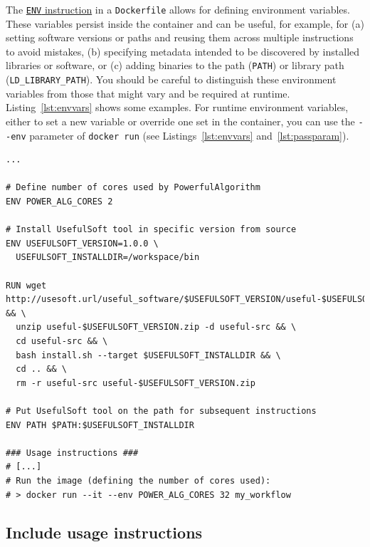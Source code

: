 \documentclass[10pt,letterpaper]{article}
\begin{document}
The
\href{https://docs.docker.com/engine/reference/builder/\#env}{\texttt{ENV}
instruction} in a \texttt{Dockerfile} allows for defining environment
variables. These variables persist inside the container and can be
useful, for example, for (a) setting software versions or paths and
reusing them across multiple instructions to avoid mistakes, (b)
specifying metadata intended to be discovered by installed libraries or
software, or (c) adding binaries to the path (\texttt{PATH}) or library
path (\texttt{LD\_LIBRARY\_PATH}). You should be careful to distinguish
these environment variables from those that might vary and be required
at runtime. Listing~\ref{lst:envvars} shows some examples. For runtime
environment variables, either to set a new variable or override one set
in the container, you can use the \texttt{-\/-env} parameter of
\texttt{docker\ run} (see Listings~\ref{lst:envvars}
and~\ref{lst:passparam}).

\scriptsize

\begin{minipage}{\linewidth}

\begin{lstlisting}[language=docker,caption={Partial \texttt{Dockerfile} showing usage of environment variables with the `ENV` instruction.},breaklines=true,label={lst:envvars}]
...

# Define number of cores used by PowerfulAlgorithm
ENV POWER_ALG_CORES 2

# Install UsefulSoft tool in specific version from source
ENV USEFULSOFT_VERSION=1.0.0 \
  USEFULSOFT_INSTALLDIR=/workspace/bin

RUN wget http://usesoft.url/useful_software/$USEFULSOFT_VERSION/useful-$USEFULSOFT_VERSION.zip && \
  unzip useful-$USEFULSOFT_VERSION.zip -d useful-src && \
  cd useful-src && \
  bash install.sh --target $USEFULSOFT_INSTALLDIR && \
  cd .. && \
  rm -r useful-src useful-$USEFULSOFT_VERSION.zip

# Put UsefulSoft tool on the path for subsequent instructions
ENV PATH $PATH:$USEFULSOFT_INSTALLDIR

### Usage instructions ###
# [...]
# Run the image (defining the number of cores used):
# > docker run --it --env POWER_ALG_CORES 32 my_workflow
\end{lstlisting}

\end{minipage}

\normalsize

\hypertarget{include-usage-instructions}{%
\subsection{Include usage
instructions}\label{include-usage-instructions}}
\end{document}
